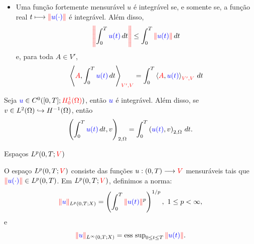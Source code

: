 \begin{frame}

\begin{itemize}


\item Uma função fortemente mensurável {\color{blue}\(u\)}  é integrável se, e somente se, 
a função real \(t\longmapsto  \nr{{\color{blue}u(\cdot)}}\) é 
integrável. Além disso,
\[
\nr*{\int_0^T {\color{blue}u(t)}\,dt}\leq \int_0^T \nr{{\color{blue}u(t)}}\,dt
\]
e, para toda {\color{red}\(A\in V'\)}, 
\[
\left\langle {\color{red}A}, \int_0^T 
{\color{blue}u(t)}\,dt\right\rangle_{{\color{red}V',V}}=\int_0^T \left\langle 
{\color{red}A}, {\color{blue}u(t)}\right\rangle_{{\color{red}V',V}}\, dt
\]
\end{itemize}
\begin{exe}
Seja \({\color{blue}u}\in C^0([0,T];{\color{red}H_0^1(\Omega)})\), então \({\color{blue}u}\) é integrável. Além disso, se \(v\in L^2(\Omega)\hookrightarrow H^{-1}(\Omega)\), então
\[
\left(\int_0^T{\color{blue}u(t)}\,dt, v\right)_{2,\Omega}
=\int_0^T\left({\color{blue}u(t)}, v\right)_{2,\Omega}\,dt.
\]
\end{exe}
\end{frame}

\begin{frame}{Espaços \(L^p(0,T;{\color{red}V})\)}
\begin{defin}
O espaço \(L^p(0,T;{\color{red}V})\) consiste das funções {\color{blue} \(u:(0,T)\longrightarrow {\color{red}V}\)} mensuráveis tais que \(\nr{{\color{blue}u(\cdot)}}\in L^p(0,T)\). Em \(L^p(0,T;{\color{red}V})\), definimos a norma:
\[
\nr{{\color{blue}u}}_{L^p(0,T;X)}=\left(\int_0^T \nr{{\color{blue}u(t)}}^p\right)^{1/p},\ 1\leq p<\infty, 
\]
e
\[
\nr{{\color{blue}u}}_{L^\infty(0,T;X)}
=\esup_{0\leq t\leq T}\nr{{\color{blue}u(t)}}.
\]
\end{defin}


\end{frame}

